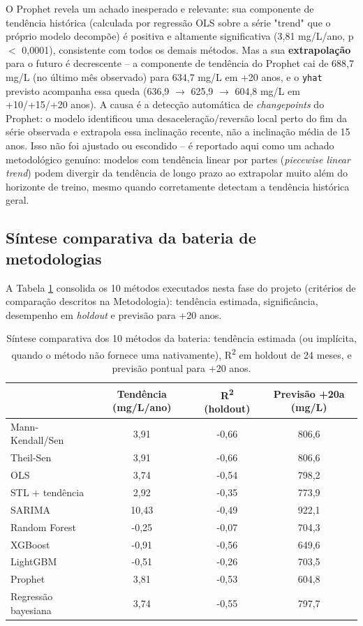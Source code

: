 O Prophet revela um achado inesperado e relevante: sua componente de tendência histórica (calculada por regressão OLS sobre a série "trend" que o próprio modelo decompõe) é positiva e altamente significativa (3,81 mg/L/ano, p $<$ 0,0001), consistente com todos os demais métodos. Mas a sua \textbf{extrapolação} para o futuro é decrescente -- a componente de tendência do Prophet cai de 688,7 mg/L (no último mês observado) para 634,7 mg/L em +20 anos, e o \texttt{yhat} previsto acompanha essa queda (636,9 $\to$ 625,9 $\to$ 604,8 mg/L em +10/+15/+20 anos). A causa é a detecção automática de \textit{changepoints} do Prophet: o modelo identificou uma desaceleração/reversão local perto do fim da série observada e extrapola essa inclinação recente, não a inclinação média de 15 anos. Isso não foi ajustado ou escondido -- é reportado aqui como um achado metodológico genuíno: modelos com tendência linear por partes (\textit{piecewise linear trend}) podem divergir da tendência de longo prazo ao extrapolar muito além do horizonte de treino, mesmo quando corretamente detectam a tendência histórica geral.

\subsection{Síntese comparativa da bateria de metodologias}

A Tabela \ref{tab:sintese} consolida os 10 métodos executados nesta fase do projeto (critérios de comparação descritos na Metodologia): tendência estimada, significância, desempenho em \textit{holdout} e previsão para +20 anos.

\begin{table}[H]
    \centering
    \small
    \begin{tabular}{l|c|c|c}
         & Tendência (mg/L/ano) & R\textsuperscript{2} (holdout) & Previsão +20a (mg/L) \\ \hline
        Mann-Kendall/Sen & 3,91 & -0,66 & 806,6 \\
        Theil-Sen & 3,91 & -0,66 & 806,6 \\
        OLS & 3,74 & -0,54 & 798,2 \\
        STL + tendência & 2,92 & -0,35 & 773,9 \\
        SARIMA & 10,43 & -0,49 & 922,1 \\
        Random Forest & -0,25 & -0,07 & 704,3 \\
        XGBoost & -0,91 & -0,56 & 649,6 \\
        LightGBM & -0,51 & -0,26 & 703,5 \\
        Prophet & 3,81 & -0,53 & 604,8 \\
        Regressão bayesiana & 3,74 & -0,55 & 797,7 \\
    \end{tabular}
    \caption{Síntese comparativa dos 10 métodos da bateria: tendência estimada (ou implícita, quando o método não fornece uma nativamente), R\textsuperscript{2} em holdout de 24 meses, e previsão pontual para +20 anos.}
    \label{tab:sintese}
\end{table}

